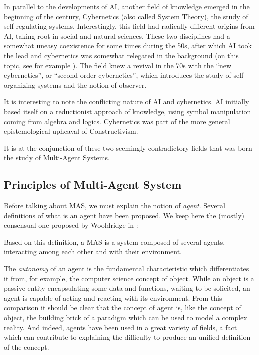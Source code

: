 In parallel to the developments of AI, another field of knowledge emerged in the beginning of the century, Cybernetics (also called System Theory), the study of self-regulating systems. Interestingly, this field had radically different origins from AI, taking root in social and natural sciences. These two disciplines had a somewhat uneasy coexistence for some times during the 50s, after which AI took the lead and cybernetics was somewhat relegated in the background (on this topic, see for example \cite{5/2/086.cariani}). The field knew a revival in the 70s with the \enquote{new cybernetics}, or \enquote{second-order cybernetics}, which introduces the study of self-organizing systems and the notion of observer.

It is interesting to note the conflicting nature of AI and cybernetics. AI initially based itself on a reductionist approach of knowledge, using symbol manipulation coming from algebra and logics. Cybernetics was part of the more general epistemological upheaval of Constructivism.

It is at the conjunction of these two seemingly contradictory fields that was born the study of Multi-Agent Systems.

\subsection{Principles of Multi-Agent System}

Before talking about MAS, we must explain the notion of \emph{agent}. Several definitions of what is an agent have been proposed. We keep here the (mostly) consensual one proposed by Wooldridge in \cite{wei1999mutiagent}:


Based on this definition, a MAS is a system composed of several agents, interacting among each other and with their environment.

The \emph{autonomy} of an agent is the fundamental characteristic which differentiates it from, for example, the computer science concept of object. While an object is a passive entity encapsulating some data and functions, waiting to be solicited, an agent is capable of acting and reacting with its environment. From this comparison it should be clear that the concept of agent is, like the concept of object, the building brick of a paradigm which can be used to model a complex reality. And indeed, agents have been used in a great variety of fields, a fact which can contribute to explaining the difficulty to produce an unified definition of the concept.

